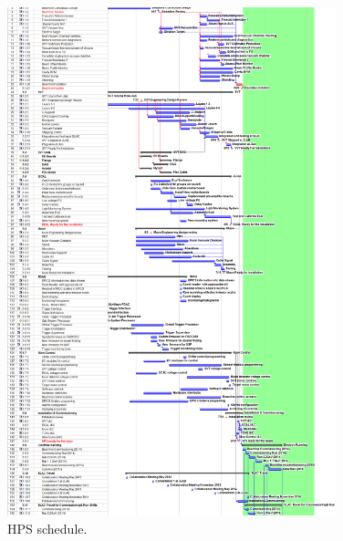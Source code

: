 \begin{figure}[h]
\centering
\includegraphics[angle=0,width=0.85\textwidth]{cost_schedule/HPSV70} 
\caption{HPS schedule.}
\label{fig:schedulea}
\end{figure}


